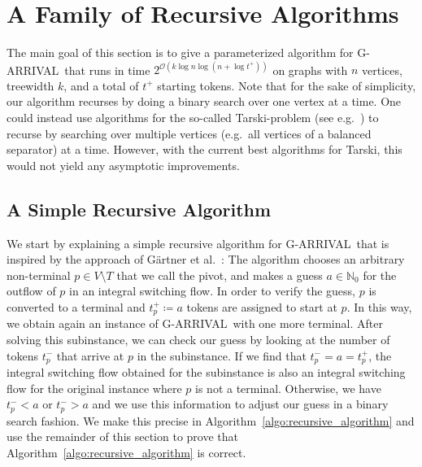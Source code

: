 \documentclass[a4paper,UKenglish,cleveref, autoref, thm-restate]{lipics-v2021}
\newcommand{\N}{\mathbb{N}}
\newcommand{\bigO}{\mathcal{O}}
\newcommand{\problem}[1]{\textrm{#1}}
\newcommand{\Tarski}{\problem{Tarski}}
\newcommand{\garrival}{\problem{G-ARRIVAL}}
\begin{document}
\section{A Family of Recursive Algorithms}
\label{sec:algorithm}

The main goal of this section is to give a parameterized algorithm for \garrival\ that runs in time $2^{\bigO \left(k \log n \log (n + \log t^+) \right)}$ on graphs with $n$ vertices, treewidth $k$, and a total of $t^+$ starting tokens. Note that for the sake of simplicity, our algorithm recurses by doing a binary search over one vertex at a time. One could instead use algorithms for the so-called \Tarski-problem (see e.g.\@~\cite{etessamiTarskiTheoremSupermodular2020}) to recurse by searching over multiple vertices (e.g.\ all vertices of a balanced separator) at a time. However, with the current best algorithms for \Tarski, this would not yield any asymptotic improvements.

\subsection{A Simple Recursive Algorithm }
\label{ssec:recursive_algorithm}

We start by explaining a simple recursive algorithm for \garrival\ that is inspired by the approach of Gärtner et al.\@~\cite{gartnerSubexponentialAlgorithmARRIVAL2021}: The algorithm chooses an arbitrary non-terminal $p \in V \setminus T$ that we call the pivot, and makes a guess $a \in \N_0$ for the outflow of $p$ in an integral switching flow. In order to verify the guess, $p$ is converted to a terminal and $t^+_p \coloneqq a$ tokens are assigned to start at $p$. In this way, we obtain again an instance of \garrival\ with one more terminal. After solving this subinstance, we can check our guess by looking at the number of tokens $t^-_p$ that arrive at $p$ in the subinstance. If we find that $t^-_p = a = t^+_p$, the integral switching flow obtained for the subinstance is also an integral switching flow for the original instance where $p$ is not a terminal. Otherwise, we have $t^-_p < a$ or $t^-_p > a$ and we use this information to adjust our guess in a binary search fashion. We make this precise in Algorithm~\ref{algo:recursive_algorithm} and use the remainder of this section to prove that Algorithm~\ref{algo:recursive_algorithm} is correct. 
\end{document}
